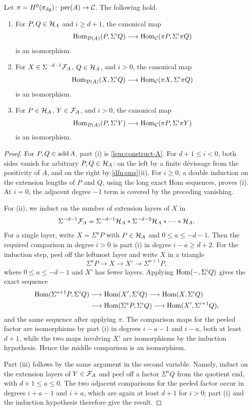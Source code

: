 \documentclass[11pt,a4paper,dvipsnames,x11names]{amsart}
\begin{document}
\begin{lem}\label{lem:hom-comparison}
Let $\pi=H^0(\pi_{\mathrm{dg}})\colon\operatorname{per}(A)\to\mathcal C$. The following hold.
\begin{enumerate}[label=\textup{(\roman*)}]
	\item For $P,Q\in\mathcal H_A$ and $i\geq d+1$, the canonical map
	\[
	\operatorname{Hom}_{\mathcal D(A)}(P,\Sigma^iQ)\longrightarrow\operatorname{Hom}_{\mathcal C}(\pi P,\Sigma^i\pi Q)
	\]
	is an isomorphism.
	\item For $X\in\Sigma^{-d-1}\mathcal F_A$, $Q\in\mathcal H_A$, and $i>0$, the canonical map
	\[
	\operatorname{Hom}_{\mathcal D(A)}(X,\Sigma^iQ)\longrightarrow\operatorname{Hom}_{\mathcal C}(\pi X,\Sigma^i\pi Q)
	\]
	is an isomorphism.
	\item For $P\in\mathcal H_A$, $Y\in\mathcal F_A$, and $i>0$, the canonical map
	\[
	\operatorname{Hom}_{\mathcal D(A)}(P,\Sigma^iY)\longrightarrow\operatorname{Hom}_{\mathcal C}(\pi P,\Sigma^i\pi Y)
	\]
	is an isomorphism.
\end{enumerate}
\end{lem}
\begin{proof}
For $P,Q\in\operatorname{add} A$, part (i) is \cref{lem:construct-A}. For $d+1\leq i<0$, both sides vanish for arbitrary $P,Q\in\mathcal H_A$: on the left by a finite d\'evissage from the positivity of $A$, and on the right by \cref{dfn:sms}(ii). For $i\geq0$, a double induction on the extension lengths of $P$ and $Q$, using the long exact Hom sequences, proves (i). At $i=0$, the adjacent degree $-1$ term is covered by the preceding vanishing.

For (ii), we induct on the number of extension layers of $X$ in
\[
\Sigma^{-d-1}\mathcal F_A
=
\Sigma^{-d-1}\mathcal H_A*\Sigma^{-d-2}\mathcal H_A*\cdots*\mathcal H_A.
\]
For a single layer, write $X=\Sigma^aP$ with $P\in\mathcal H_A$ and $0\leq a\leq-d-1$. Then the required comparison in degree $i>0$ is part (i) in degree $i-a\geq d+2$. For the induction step, peel off the leftmost layer and write $X$ in a triangle
\[
\Sigma^aP\longrightarrow X\longrightarrow X'\longrightarrow\Sigma^{a+1}P,
\]
where $0\leq a\leq-d-1$ and $X'$ has fewer layers. Applying $\operatorname{Hom}(-,\Sigma^iQ)$ gives the exact sequence
\[
\begin{aligned}
\operatorname{Hom}(\Sigma^{a+1}P,\Sigma^iQ)&\longrightarrow\operatorname{Hom}(X',\Sigma^iQ)\longrightarrow\operatorname{Hom}(X,\Sigma^iQ)\\
&\longrightarrow\operatorname{Hom}(\Sigma^aP,\Sigma^iQ)\longrightarrow\operatorname{Hom}(X',\Sigma^{i+1}Q),
\end{aligned}
\]
and the same sequence after applying $\pi$. The comparison maps for the peeled factor are isomorphisms by part (i) in degrees $i-a-1$ and $i-a$, both at least $d+1$, while the two maps involving $X'$ are isomorphisms by the induction hypothesis. Hence the middle comparison is an isomorphism.

Part (iii) follows by the same argument in the second variable. Namely, induct on the extension layers of $Y\in\mathcal F_A$ and peel off a factor $\Sigma^aQ$ from the quotient end, with $d+1\leq a\leq0$. The two adjacent comparisons for the peeled factor occur in degrees $i+a-1$ and $i+a$, which are again at least $d+1$ for $i>0$; part (i) and the induction hypothesis therefore give the result.
\end{proof}
\end{document}
